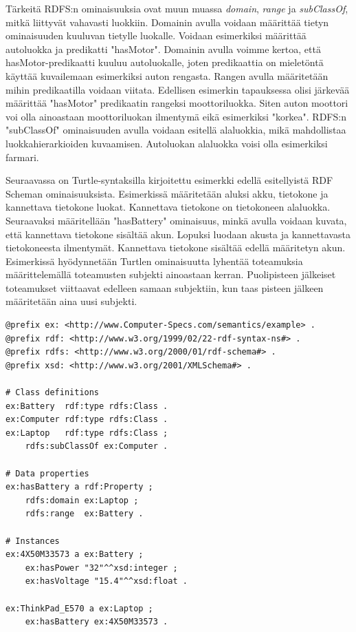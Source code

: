 \documentclass[finnish, 12pt, a4paper, elec, utf8, pdfa, online]{aaltothesis}
\begin{document}
Tärkeitä RDFS:n ominaisuuksia ovat muun muassa \textit{domain}, \textit{range} ja \textit{subClassOf}, mitkä liittyvät vahavasti luokkiin. Domainin avulla voidaan määrittää tietyn ominaisuuden kuuluvan tietylle luokalle. Voidaan esimerkiksi määrittää autoluokka ja predikatti "hasMotor". Domainin avulla voimme kertoa, että hasMotor-predikaatti kuuluu autoluokalle, joten predikaattia on mieletöntä käyttää kuvailemaan esimerkiksi auton rengasta. Rangen avulla määritetään mihin predikaatilla voidaan viitata. Edellisen esimerkin tapauksessa olisi järkevää määrittää "hasMotor" predikaatin rangeksi moottoriluokka. Siten auton moottori voi olla ainoastaan moottoriluokan ilmentymä eikä esimerkiksi "korkea". RDFS:n "subClassOf" ominaisuuden avulla voidaan esitellä alaluokkia, mikä mahdollistaa luokkahierarkioiden kuvaamisen. Autoluokan alaluokka voisi olla esimerkiksi farmari.

Seuraavassa on Turtle-syntaksilla kirjoitettu esimerkki edellä esitellyistä RDF Scheman ominaisuuksista. Esimerkissä määritetään aluksi akku, tietokone ja kannettava tietokone luokat. Kannettava tietokone on tietokoneen alaluokka. Seuraavaksi määritellään "hasBattery" ominaisuus, minkä avulla voidaan kuvata, että kannettava tietokone sisältää akun. Lopuksi luodaan akusta ja kannettavasta tietokoneesta ilmentymät. Kannettava tietokone sisältää edellä määritetyn akun. Esimerkissä hyödynnetään Turtlen ominaisuutta lyhentää toteamuksia määrittelemällä toteamusten subjekti ainoastaan kerran. Puolipisteen jälkeiset toteamukset viittaavat edelleen samaan subjektiin, kun taas pisteen jälkeen määritetään aina uusi subjekti.

\vskip 0.75cm
\begin{lstlisting}[style=codeblock]
@prefix ex: <http://www.Computer-Specs.com/semantics/example> .
@prefix rdf: <http://www.w3.org/1999/02/22-rdf-syntax-ns#> .
@prefix rdfs: <http://www.w3.org/2000/01/rdf-schema#> .
@prefix xsd: <http://www.w3.org/2001/XMLSchema#> .

# Class definitions
ex:Battery  rdf:type rdfs:Class .
ex:Computer rdf:type rdfs:Class .
ex:Laptop   rdf:type rdfs:Class ;
    rdfs:subClassOf ex:Computer .

# Data properties
ex:hasBattery a rdf:Property ;
    rdfs:domain ex:Laptop ;
    rdfs:range  ex:Battery .

# Instances
ex:4X50M33573 a ex:Battery ;
    ex:hasPower "32"^^xsd:integer ;
    ex:hasVoltage "15.4"^^xsd:float .

ex:ThinkPad_E570 a ex:Laptop ;
    ex:hasBattery ex:4X50M33573 .


\end{lstlisting}
\vskip 0.75cm
\end{document}
